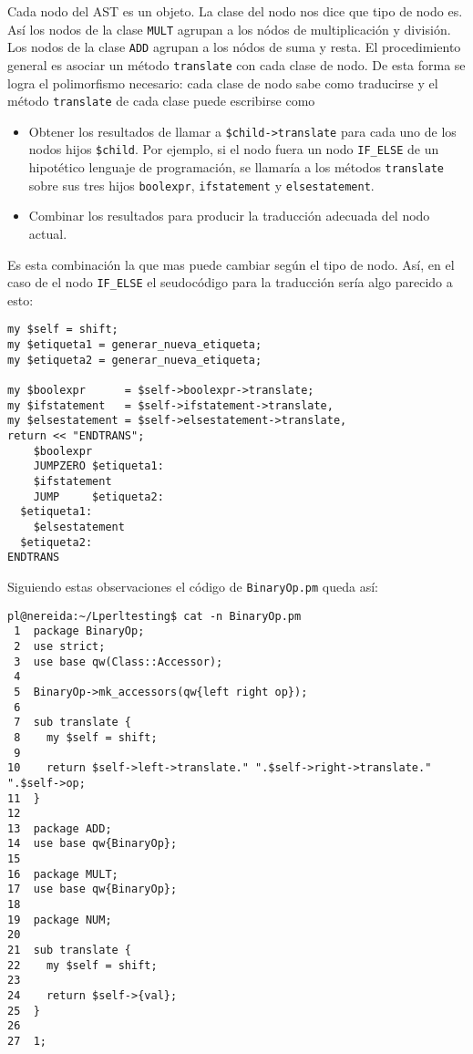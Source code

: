
Cada nodo del AST es un objeto. La clase del nodo nos dice que tipo de nodo es.
Así los nodos de la clase \verb|MULT| agrupan a los nódos de multiplicación y división.
Los nodos de la clase \verb|ADD| agrupan a los nódos de suma y resta.
El procedimiento general es asociar un método \verb|translate| con cada clase de nodo.
De esta forma se logra el polimorfismo necesario: cada clase de nodo sabe como traducirse
y el método \verb|translate| de cada clase puede escribirse como
\begin{itemize}
\item Obtener los resultados de llamar a \verb|$child->translate| para cada uno
de los nodos hijos \verb|$child|. Por ejemplo, si el nodo fuera un nodo \verb|IF_ELSE|
de un hipotético lenguaje de programación, se llamaría a los métodos \verb|translate| sobre sus tres hijos
\verb|boolexpr|, \verb|ifstatement| y \verb|elsestatement|.
\item Combinar los resultados para producir la traducción adecuada del nodo actual.
\end{itemize}
Es esta combinación la que mas puede cambiar según el tipo de nodo. Así, en el caso de 
el nodo \verb|IF_ELSE| el seudocódigo para la traducción sería algo parecido a esto:

\begin{verbatim}
my $self = shift;
my $etiqueta1 = generar_nueva_etiqueta;
my $etiqueta2 = generar_nueva_etiqueta;

my $boolexpr      = $self->boolexpr->translate;
my $ifstatement   = $self->ifstatement->translate,  
my $elsestatement = $self->elsestatement->translate, 
return << "ENDTRANS";
    $boolexpr
    JUMPZERO $etiqueta1:
    $ifstatement
    JUMP     $etiqueta2:
  $etiqueta1:
    $elsestatement
  $etiqueta2:
ENDTRANS
\end{verbatim}

Siguiendo estas observaciones el código de \verb|BinaryOp.pm| queda así:
\begin{verbatim}
pl@nereida:~/Lperltesting$ cat -n BinaryOp.pm
 1  package BinaryOp;
 2  use strict;
 3  use base qw(Class::Accessor);
 4
 5  BinaryOp->mk_accessors(qw{left right op});
 6
 7  sub translate {
 8    my $self = shift;
 9
10    return $self->left->translate." ".$self->right->translate." ".$self->op;
11  }
12
13  package ADD;
14  use base qw{BinaryOp};
15
16  package MULT;
17  use base qw{BinaryOp};
18
19  package NUM;
20
21  sub translate {
22    my $self = shift;
23
24    return $self->{val};
25  }
26
27  1;
\end{verbatim}

